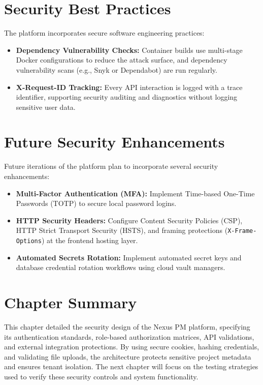 \section{Security Best Practices}
The platform incorporates secure software engineering practices:
\begin{itemize}
    \item \textbf{Dependency Vulnerability Checks:} Container builds use multi-stage Docker configurations to reduce the attack surface, and dependency vulnerability scans (e.g., Snyk or Dependabot) are run regularly.
    \item \textbf{X-Request-ID Tracking:} Every API interaction is logged with a trace identifier, supporting security auditing and diagnostics without logging sensitive user data.
\end{itemize}

\section{Future Security Enhancements}
Future iterations of the platform plan to incorporate several security enhancements:
\begin{itemize}
    \item \textbf{Multi-Factor Authentication (MFA):} Implement Time-based One-Time Passwords (TOTP) to secure local password logins.
    \item \textbf{HTTP Security Headers:} Configure Content Security Policies (CSP), HTTP Strict Transport Security (HSTS), and framing protections (\texttt{X-Frame-Options}) at the frontend hosting layer.
    \item \textbf{Automated Secrets Rotation:} Implement automated secret keys and database credential rotation workflows using cloud vault managers.
\end{itemize}

\section{Chapter Summary}
This chapter detailed the security design of the Nexus PM platform, specifying its authentication standards, role-based authorization matrices, API validations, and external integration protections. By using secure cookies, hashing credentials, and validating file uploads, the architecture protects sensitive project metadata and ensures tenant isolation. The next chapter will focus on the testing strategies used to verify these security controls and system functionality.
